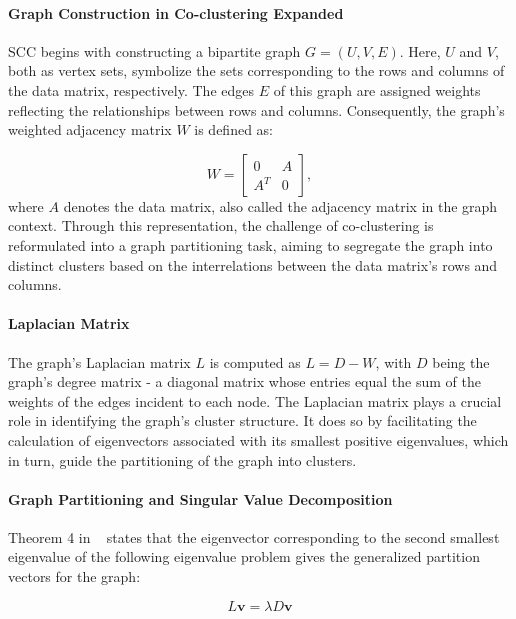 \documentclass[journal]{IEEEtran}
\renewcommand{\cite}[1]{~\autocite{#1}}
\begin{document}
\paragraph{Graph Construction in Co-clustering Expanded}

SCC begins with constructing a bipartite graph $G=(U,V,E)$. Here, $U$ and $V$, both as vertex sets, symbolize the sets corresponding to the rows and columns of the data matrix, respectively. The edges $E$ of this graph are assigned weights reflecting the relationships between rows and columns. Consequently, the graph's weighted adjacency matrix $W$ is defined as:

\begin{equation} W = \begin{bmatrix} 0 & A \\ A^T & 0 \end{bmatrix}, \end{equation}
where $A$ denotes the data matrix, also called the adjacency matrix in the graph context.
Through this representation, the challenge of co-clustering is reformulated into a graph partitioning task, aiming to segregate the graph into distinct clusters based on the interrelations between the data matrix's rows and columns.

\paragraph{Laplacian Matrix}

The graph's Laplacian matrix $L$ is computed as $L=D-W$, with $D$ being the graph's degree matrix - a diagonal matrix whose entries equal the sum of the weights of the edges incident to each node. The Laplacian matrix plays a crucial role in identifying the graph's cluster structure. It does so by facilitating the calculation of eigenvectors associated with its smallest positive eigenvalues, which in turn, guide the partitioning of the graph into clusters.

\paragraph{Graph Partitioning and Singular Value Decomposition}

Theorem 4 in \cite{dhillon2001CoclusteringDocumentsWords} states that the eigenvector corresponding to the second smallest eigenvalue of the following eigenvalue problem gives the generalized partition vectors for the graph:

\begin{equation}
  L \mathbf{v} = \lambda D \mathbf{v}
  \label{eq:eigenvalue_problem}
\end{equation}
\end{document}
